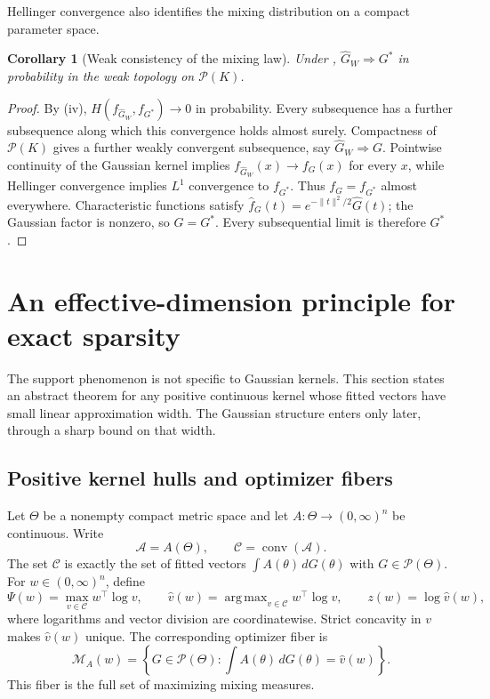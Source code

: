 \documentclass[11pt]{article}
\newtheorem{corollary}[theorem]{Corollary}
\theoremstyle{definition}
\theoremstyle{remark}
\DeclareMathOperator*{\argmax}{arg\,max}
\DeclareMathOperator{\conv}{conv}
\newcommand{\Pcal}{\mathcal P}
\newcommand{\Mcal}{\mathcal M}
\newcommand{\Ccal}{\mathcal C}
\newcommand{\Acal}{\mathcal A}
\newcommand{\norm}[1]{\lVert #1\rVert}
\newcommand{\vhat}{\widehat v}
\newcommand{\Ghat}{\widehat G}
\begin{document}
Hellinger convergence also identifies the mixing distribution on a compact
parameter space.

\begin{corollary}[Weak consistency of the mixing law]
\label{cor:weak}
Under , $\Ghat_W\Rightarrow G^*$ in probability in the weak
topology on $\Pcal(K)$.
\end{corollary}

\begin{proof}
By (iv), $H(f_{\Ghat_W},f_{G^*})\to0$ in probability.  Every
subsequence has a further subsequence along which this convergence holds
almost surely.  Compactness of $\Pcal(K)$ gives a further weakly convergent
subsequence, say $\Ghat_W\Rightarrow G$.  Pointwise continuity of the
Gaussian kernel implies $f_{\Ghat_W}(x)\to f_G(x)$ for every $x$, while
Hellinger convergence implies $L^1$ convergence to $f_{G^*}$.  Thus
$f_G=f_{G^*}$ almost everywhere.  Characteristic functions satisfy
$\widehat f_G(t)=e^{-\norm{t}^2/2}\widehat G(t)$; the Gaussian factor is
nonzero, so $G=G^*$.  Every subsequential limit is therefore $G^*$.
\end{proof}

\section{An effective-dimension principle for exact sparsity}
\label{sec:effective}

The support phenomenon is not specific to Gaussian kernels.  This section
states an abstract theorem for any positive continuous kernel whose fitted
vectors have small linear approximation width.  The Gaussian structure enters
only later, through a sharp bound on that width.

\subsection{Positive kernel hulls and optimizer fibers}

Let $\Theta$ be a nonempty compact metric space and let
$A:\Theta\to(0,\infty)^n$ be continuous.  Write
\[
 \Acal=A(\Theta),\qquad \Ccal=\conv(\Acal).
\]
The set $\Ccal$ is exactly the set of fitted vectors
$\int A(\theta)\,dG(\theta)$ with $G\in\Pcal(\Theta)$.  For
$w\in(0,\infty)^n$, define
\begin{equation}\label{eq:value}
 \Psi(w)=\max_{v\in\Ccal}w^\top\log v,
 \qquad
 \vhat(w)=\argmax_{v\in\Ccal}w^\top\log v,
 \qquad z(w)=\log\vhat(w),
\end{equation}
where logarithms and vector division are coordinatewise.  Strict concavity in
$v$ makes $\vhat(w)$ unique.  The corresponding optimizer fiber is
\begin{equation}\label{eq:fiber}
 \Mcal_A(w)=\left\{G\in\Pcal(\Theta):
       \int A(\theta)\,dG(\theta)=\vhat(w)\right\}.
\end{equation}
This fiber is the full set of maximizing mixing measures.
\end{document}
